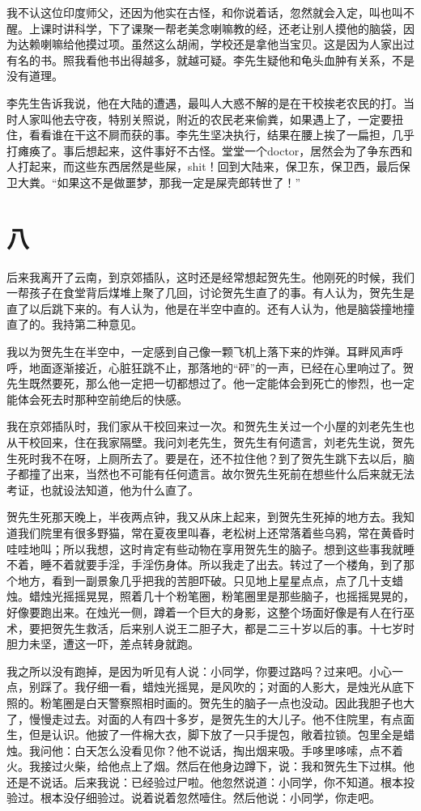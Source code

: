 我不认这位印度师父，还因为他实在古怪，和你说着话，忽然就会入定，叫也叫不醒。上课时讲科学，下了课聚一帮老美念喇嘛教的经，还老让别人摸他的脑袋，因为达赖喇嘛给他摸过项。虽然这么胡闹，学校还是拿他当宝贝。这是因为人家出过有名的书。照我看他书出得越多，就越可疑。李先生疑他和龟头血肿有关系，不是没有道理。 

李先生告诉我说，他在大陆的遭遇，最叫人大惑不解的是在干校挨老农民的打。当时人家叫他去守夜，特别关照说，附近的农民老来偷粪，如果遇上了，一定要扭住，看看谁在干这不屙而获的事。李先生坚决执行，结果在腰上挨了一扁担，几乎打瘫痪了。事后想起来，这件事好不古怪。堂堂一个doctor，居然会为了争东西和人打起来，而这些东西居然是些屎，shit！回到大陆来，保卫东，保卫西，最后保卫大粪。“如果这不是做噩梦，那我一定是屎壳郎转世了！”

\section{八}

后来我离开了云南，到京郊插队，这时还是经常想起贺先生。他刚死的时候，我们一帮孩子在食堂背后煤堆上聚了几回，讨论贺先生直了的事。有人认为，贺先生是直了以后跳下来的。有人认为，他是在半空中直的。还有人认为，他是脑袋撞地撞直了的。我持第二种意见。 

我以为贺先生在半空中，一定感到自己像一颗飞机上落下来的炸弹。耳畔风声呼呼，地面逐渐接近，心脏狂跳不止，那落地的“砰”的一声，已经在心里响过了。贺先生既然要死，那么他一定把一切都想过了。他一定能体会到死亡的惨烈，也一定能体会死去时那种空前绝后的快感。 

我在京郊插队时，我们家从干校回来过一次。和贺先生关过一个小屋的刘老先生也从干校回来，住在我家隔壁。我问刘老先生，贺先生有何遗言，刘老先生说，贺先生死时我不在呀，上厕所去了。要是在，还不拉住他？到了贺先生跳下去以后，脑子都撞了出来，当然也不可能有任何遗言。故尔贺先生死前在想些什么后来就无法考证，也就设法知道，他为什么直了。 

贺先生死那天晚上，半夜两点钟，我又从床上起来，到贺先生死掉的地方去。我知道我们院里有很多野猫，常在夏夜里叫春，老松树上还常落着些乌鸦，常在黄昏时哇哇地叫；所以我想，这时肯定有些动物在享用贺先生的脑子。想到这些事我就睡不着，睡不着就要手淫，手淫伤身体。所以我走了出去。转过了一个楼角，到了那个地方，看到一副景象几乎把我的苦胆吓破。只见地上星星点点，点了几十支蜡烛。蜡烛光摇摇晃晃，照着几十个粉笔圈，粉笔圈里是那些脑子，也摇摇晃晃的，好像要跑出来。在烛光一侧，蹲着一个巨大的身影，这整个场面好像是有人在行巫术，要把贺先生救活，后来别人说王二胆子大，都是二三十岁以后的事。十七岁时胆力未坚，遭这一吓，差点转身就跑。 


我之所以没有跑掉，是因为听见有人说：小同学，你要过路吗？过来吧。小心一点，别踩了。我仔细一看，蜡烛光摇晃，是风吹的；对面的人影大，是烛光从底下照的。粉笔圈是白天警察照相时画的。贺先生的脑子一点也没动。因此我胆子也大了，慢慢走过去。对面的人有四十多岁，是贺先生的大儿子。他不住院里，有点面生，但是认识。他披了一件棉大衣，脚下放了一只手提包，敞着拉锁。包里全是蜡烛。我问他：白天怎么没看见你？他不说话，掏出烟来吸。手哆里哆嗦，点不着火。我接过火柴，给他点上了烟。然后在他身边蹲下，说：我和贺先生下过棋。他还是不说话。后来我说：已经验过尸啦。他忽然说道：小同学，你不知道。根本投验过。根本没仔细验过。说着说着忽然噎住。然后他说：小同学，你走吧。 

